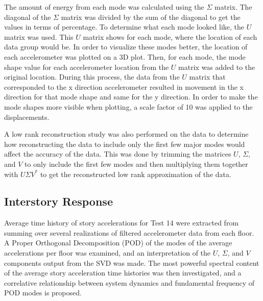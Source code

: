 \documentclass{article}
\begin{document}
\medskip

The amount of energy from each mode was calculated using the $\Sigma$ matrix. The diagonal of the $\Sigma$ matrix was divided by the sum of the diagonal to get the values in terms of percentage. To determine what each mode looked like, the $U$ matrix was used. This $U$ matrix shows for each mode, where the location of each data group would be. In order to visualize these modes better, the location of each accelerometer was plotted on a 3D plot. Then, for each mode, the mode shape value for each accelerometer location from the $U$ matrix was added to the original location. During this process, the data from the $U$ matrix that corresponded to the x direction accelerometer resulted in movement in the x direction for that mode shape and same for the y direction. In order to make the mode shapes more visible when plotting, a scale factor of 10 was applied to the displacements.

\medskip

A low rank reconstruction study was also performed on the data to determine how reconstructing the data to include only the first few major modes would affect the accuracy of the data. This was done by trimming the matrices $U$, $\Sigma$, and $V$ to only include the first few modes and then multiplying them together with $U\Sigma V^{*}$ to get the reconstructed low rank approximation of the data. 

\subsection{Interstory Response}

Average time history of story accelerations for Test 14 were extracted from summing over several realizations of filtered accelerometer data from each floor. A Proper Orthogonal Decomposition (POD) of the modes of the average accelerations per floor was examined, and an interpretation of the $U$, $\Sigma$, and $V$ components output from the SVD was made. The most powerful spectral content of the average story acceleration time histories was then investigated, and a correlative relationship between system dynamics and fundamental frequency of POD modes is proposed.

\medskip
\end{document}
